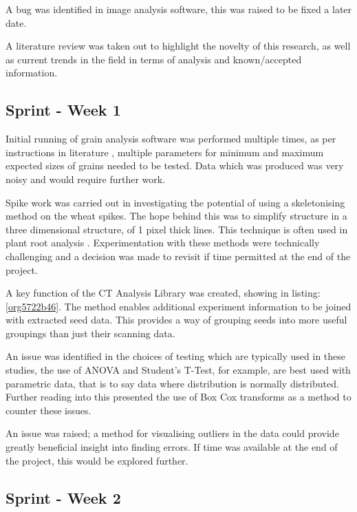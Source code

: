 \documentclass[11pt]{report}
\begin{document}
A bug was identified in image analysis software, this was raised to be fixed a later date.

A literature review was taken out to highlight the novelty of this research, as well as current trends in the field in terms of analysis and known/accepted information.

\subsection{Sprint - Week 1}
\label{sec:orgae7f82e}

Initial running of grain analysis software was performed multiple times, as per instructions in literature \cite{Hughes2017}, multiple parameters for minimum and maximum expected sizes of grains needed to be tested. Data which was produced was very noisy and would require further work.

Spike work was carried out in investigating the potential of using a skeletonising method on the wheat spikes. The hope behind this was to simplify structure in a three dimensional structure, of 1 pixel thick lines. This technique is often used in plant root analysis \cite{Mairhofer2015,Daly2017}. Experimentation with these methods were technically challenging and a decision was made to revisit if time permitted at the end of the project.

A key function of the CT Analysis Library was created, showing in listing:\ref{org5722b46}. The method enables additional experiment information to be joined with extracted seed data. This provides a way of grouping seeds into more useful groupings than just their scanning data.

An issue was identified in the choices of testing which are typically used in these studies, the use of ANOVA and Student's T-Test, for example, are best used with parametric data, that is to say data where distribution is normally distributed. Further reading into this presented the use of Box Cox transforms as a method to counter these issues.

An issue was raised; a method for visualising outliers in the data could provide greatly beneficial insight into finding errors. If time was available at the end of the project, this would be explored further.

\subsection{Sprint - Week 2}
\label{sec:orgee30fc4}
\end{document}
